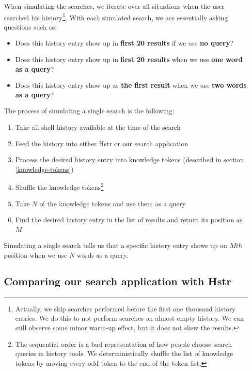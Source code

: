 When simulating the searches, we iterate over all situations when the user searched his history\footnote{Actually, we skip searches performed before the first one thousand history entries. We do this to not perform searches on almost empty history. We can still observe some minor warm-up effect, but it does not skew the results.}. With each simulated search, we are essentially asking questions such as:

\begin{itemize}
    \item Does this history entry show up in \textbf{first 20 results} if we use \textbf{no query}?
    \item Does this history entry show up in \textbf{first 20 results} when we use \textbf{one word as a query}?
    \item Does this history entry show up as \textbf{the first result} when we use \textbf{two words as a query}?
\end{itemize}
The process of simulating a single search is the following:

\begin{enumerate}
    \item Take all shell history available at the time of the search
    \item Feed the history into either Hstr or our search application
    \item Process the desired history entry into knowledge tokens (described in section \ref{knowledge-tokens})
    \item Shuffle the knowledge tokens\footnote{The sequential order is a bad representation of how people choose search queries in history tools. We deterministically shuffle the list of knowledge tokens by moving every odd token to the end of the token list.}
    \item Take \(N\) of the knowledge tokens and use them as a query
    \item Find the desired history entry in the list of results and return its position as \(M\)
\end{enumerate}

Simulating a single search tells us that a specific history entry shows up on \(Mth\) position when we use \(N\) words as a query.


\subsection{Comparing our search application with Hstr}

